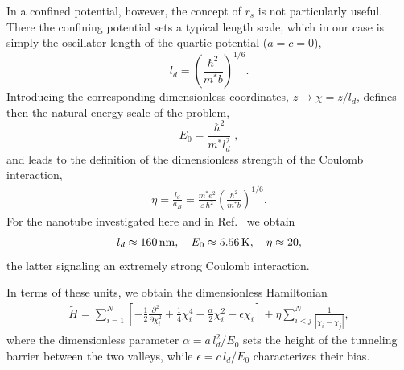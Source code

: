 \documentclass[aps, prb, floatfix, twocolumn, notitlepage, superscriptaddress, 10pt]{revtex4-2}
\newcommand{\n}{N}
\newcommand{\1}{{1\hspace*{-0.5ex} \textrm{l} \hspace*{0.5ex}}}
\begin{document}
In a confined potential, however, the concept of $r_s$ is not particularly useful.
There the confining potential sets a typical length scale, which in our case is simply 
the oscillator length of the quartic potential ($a = c=0$), 
\begin{equation}
	l_d = \left( \frac{\hbar^2}{m^* b} \right)^{1/6}.
\end{equation}
Introducing  the corresponding dimensionless coordinates, $z\to \chi = z/l_d$, defines then 
the natural energy scale of the problem, 
\begin{equation}
	E_0 = \frac{\hbar^2}{m^* l_d^2}\;,
\end{equation}
and leads to the definition of the dimensionless  strength of the Coulomb interaction, 
\begin{gather}
	\eta = \frac{l_d}{a_B} = \frac{m^* e^2}{\varepsilon \, \hbar^2}\left ( \frac{\hbar^2}{m^*b}\right )^{1/6}.
\label{eq:eta}	
\end{gather}
For the nanotube investigated here and in Ref.~\cite{Shapir.2019} we obtain 
 \begin{eqnarray}
 l_d\approx 160 \,{\rm{ nm}}, \phantom{22}
 E_0 %
 \approx 5.56\, {\rm{ K}}, \phantom{22}
 \eta \approx 20, 
 \end{eqnarray}
the latter signaling an extremely strong Coulomb interaction. 


%



  	

In terms of these units, we  obtain  the dimensionless Hamiltonian
\begin{gather}\label{eq:Hamiltonian_2}
	\tilde{H} = \sum_{i = 1}^\n \left[ -\frac{1}{2}\frac{\partial^2}{\partial \chi_i^2} +\frac{1}{4} \chi_i^4 - \frac{\alpha}{2}\chi_i^2 -  \epsilon \chi_i \right] + \eta \sum_{i < j}^\n \frac{1}{\left| \chi_i - \chi_j  \right|},
\end{gather}
where the dimensionless parameter $\alpha= a \,l_d^2/E_0$  sets the height of the tunneling barrier between the two valleys, while 
$\epsilon= c\, l_d/E_0$ characterizes their bias.   
\end{document}
